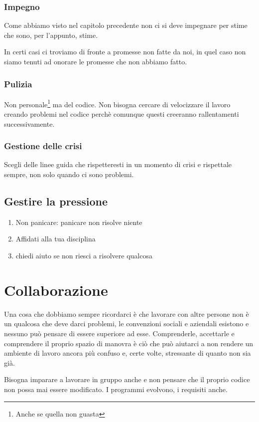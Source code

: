 \documentclass[11pt,a4paper]{book}
\begin{document}
\subsection{Impegno}
Come abbiamo visto nel capitolo precedente non ci si deve impegnare per stime che sono, per l'appunto, stime.

In certi casi ci troviamo di fronte a promesse non fatte da noi, in quel caso non siamo tenuti ad onorare le promesse che non abbiamo fatto.

\subsection{Pulizia}
Non personale\footnote{Anche se quella non guasta} ma del codice. Non bisogna cercare di velocizzare il lavoro creando problemi nel codice perchè comunque questi creeranno rallentamenti successivamente.

\subsection{Gestione delle crisi}
Scegli delle linee guida che rispetteresti in un momento di crisi e rispettale sempre, non solo quando ci sono problemi.

\section{Gestire la pressione}
\begin{enumerate}
	\item Non panicare: panicare non risolve niente
	\item Affidati alla tua disciplina
	\item chiedi aiuto se non riesci a risolvere qualcosa
\end{enumerate}

\chapter{Collaborazione}
Una cosa che dobbiamo sempre ricordarci è che lavorare con altre persone non è un qualcosa che deve darci problemi, le convenzioni sociali e aziendali esistono e nessuno può pensare di essere superiore ad esse. Comprenderle, accettarle e comprendere il proprio spazio di manovra è ciò che può aiutarci a non rendere un ambiente di lavoro ancora più confuso e, certe volte, stressante di quanto non sia già.

Bisogna imparare a lavorare in gruppo anche e non pensare che il proprio codice non possa mai essere modificato. I programmi evolvono, i requisiti anche.
\end{document}
